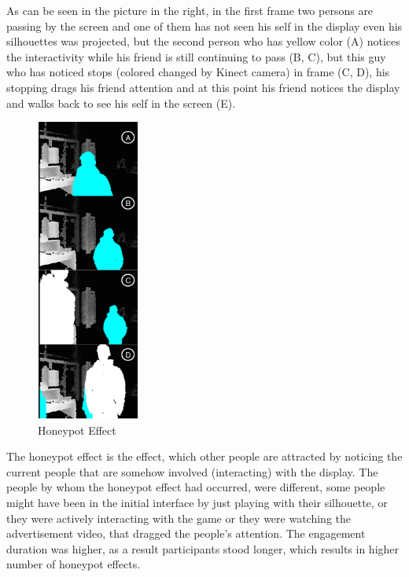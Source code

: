 As can be seen in the picture in the right, in the first frame two persons are passing by the screen and one of them has not seen his self in the display even his silhouettes was projected, but the second person who has yellow color (A) notices the interactivity while his friend is still continuing to pass (B, C), but this guy who has noticed stops (colored changed by Kinect camera) in frame (C, D), his stopping drags his friend attention and at this point his friend notices the display and walks back to see his self in the screen (E).


\begin{figure}
  \vspace{-20pt}
  \begin{center}
    \includegraphics[width=0.3\textwidth,height=100mm]{figures/8/body_inter_findings/effects/honeypot}
  \end{center}
  \vspace{-20pt}
  \caption{Honeypot Effect}
  \vspace{-20pt}
\end{figure}
The honeypot effect is the effect, which other people are attracted by noticing the current people that are somehow involved (interacting) with the display. The people by whom the honeypot effect had occurred, were different, some people might have been in the initial interface by just playing with their silhouette, or they were actively interacting with the game or they were watching the advertisement video, that dragged the people’s attention. The engagement duration was higher, as a result participants stood longer, which results in higher number of honeypot effects.

